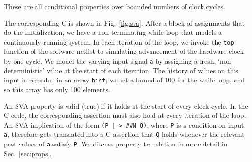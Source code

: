 \noindent These are all conditional properties over bounded numbers of clock cycles. 
 
The corresponding C is shown in Fig.~\ref{fig:sva}. After a block of assignments that do the initialization, we have a non-terminating while-loop that models a continuously-running system. In each iteration of the loop, we invoke the \texttt{top} function of the software netlist to simulating advancement of the hardware clock by one cycle.   We model the varying input signal \texttt{a} by assigning a fresh, `non-deterministic' value at the start of each iteration. The history of values on this input is recorded in an array \texttt{hist}; we set a bound of 100 for the while loop, and so this array has only 100 elements. 

An SVA property is valid (true) if it holds at the start  of every clock cycle. In the C code, the corresponding assertion must also hold at every iteration of the loop. An SVA implication of the form \texttt{(P |-> \#\#N Q)}, where \texttt{P} is a condition on input \texttt{a}, therefore gets translated into a C assertion that \texttt{Q} holds whenever the relevant past values of \texttt{a} satisfy \texttt{P}. We discuss property translation in more detail in Sec.~\ref{sec:props}.

